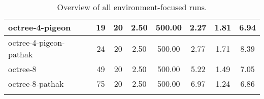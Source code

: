 \begin{sidewaystable}
\begin{longtable}{|l|c|c|c|c|c|c|c|}
        octree-4-pigeon & {\cellcolor[HTML]{D9E9E6}} \color[HTML]{000000} 19 & 20 & 2.50 & {\cellcolor[HTML]{D9E9E6}} \color[HTML]{000000} 500.00 & {\cellcolor[HTML]{EBF2F0}} \color[HTML]{000000} 2.27 & 1.81 & 6.94 \\ \hline
        octree-4-pigeon-pathak & {\cellcolor[HTML]{D1E6E1}} \color[HTML]{000000} 24 & 20 & 2.50 & {\cellcolor[HTML]{D9E9E6}} \color[HTML]{000000} 500.00 & {\cellcolor[HTML]{EBF2F0}} \color[HTML]{000000} 2.77 & 1.71 & 8.39 \\ \hline
        octree-8 & {\cellcolor[HTML]{A8D2C9}} \color[HTML]{000000} 49 & 20 & 2.50 & {\cellcolor[HTML]{D9E9E6}} \color[HTML]{000000} 500.00 & {\cellcolor[HTML]{EBF2F0}} \color[HTML]{000000} 5.22 & 1.49 & 7.05 \\ \hline
        octree-8-pathak & {\cellcolor[HTML]{7EBEB1}} \color[HTML]{000000} 75 & 20 & 2.50 & {\cellcolor[HTML]{D9E9E6}} \color[HTML]{000000} 500.00 & {\cellcolor[HTML]{EBF2F0}} \color[HTML]{000000} 6.97 & 1.24 & 6.86 \\ \hline
    
    
        \caption{Overview of all environment-focused runs. \label{tab:RQ1-results-octreeFocusedRuns}}
    \end{longtable}

\end{sidewaystable}
